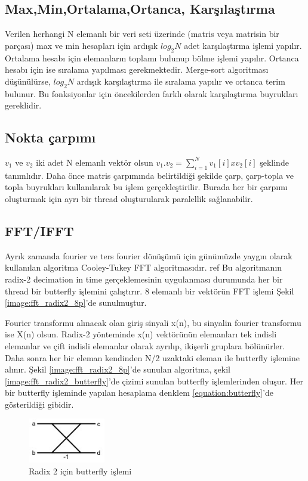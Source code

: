 \subsection{Max,Min,Ortalama,Ortanca, Karşılaştırma}
Verilen herhangi N elemanlı bir veri seti üzerinde (matris veya matrisin bir parçası) max ve min hesapları için ardışık $log_{2}N$ adet karşılaştırma işlemi yapılır. Ortalama hesabı için elemanların toplamı bulunup bölme işlemi yapılır. Ortanca hesabı için ise sıralama yapılması gerekmektedir. Merge-sort algoritması düşünülürse, $log_{2}N$ ardışık karşılaştırma ile sıralama yapılır ve ortanca terim bulunur. Bu fonksiyonlar için öncekilerden farklı olarak karşılaştırma buyrukları gereklidir. 

\subsection{Nokta çarpımı}
$v_{1}$ ve $v_{2}$ iki adet N elemanlı vektör olsun $v_{1} . v_{2} = \sum_{i=1}^{N} v_{1}[i] x v_{2}[i]$ şeklinde tanımlıdır. Daha önce matris çarpımında belirtildiği şekilde çarp, çarp-topla ve topla buyrukları kullanılarak bu işlem gerçekleştirilir. Burada her bir çarpımı oluşturmak için ayrı bir thread oluşturularak paralellik sağlanabilir.

\subsection{FFT/IFFT}
Ayrık zamanda fourier ve ters fourier dönüşümü için günümüzde yaygın olarak kullanılan algoritma Cooley-Tukey FFT algoritmasıdır. ref{} Bu algoritmanın radix-2 decimation in time gerçeklemesinin uygulanması durumunda her bir thread bir butterfly işlemini çalıştırır. 8 elemanlı bir vektörün FFT işlemi Şekil \ref{image:fft_radix2_8p}'de sunulmuştur. \par

Fourier transformu alınacak olan giriş sinyali x(n), bu sinyalin fourier transformu ise X(n) olsun.
Radix-2 yönteminde x(n) vektörünün elemanları tek indisli elemanlar ve çift indisli elemanlar olarak ayrılıp, ikişerli gruplara bölünürler. Daha sonra her bir eleman kendinden N/2 uzaktaki eleman ile butterfly işlemine alınır. Şekil \ref{image:fft_radix2_8p}'de sunulan algoritma, şekil \ref{image:fft_radix2_butterfly}'de çizimi sunulan butterfly işlemlerinden oluşur. Her bir butterfly işleminde yapılan hesaplama denklem \ref{equation:butterfly}'de gösterildiği gibidir.

\begin{figure}
\centering
\shorthandoff{=}
\includegraphics[width=0.3\textwidth]{gorsel/fft_radix2_butterfly.jpg}
\shorthandoff{=}
\caption{Radix 2 için butterfly işlemi}
\label{fft_radix2_butterfly}
\end{figure}

